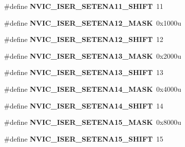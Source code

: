 \begin{DoxyCompactItemize}
\#define {\bfseries N\+V\+I\+C\+\_\+\+I\+S\+E\+R\+\_\+\+S\+E\+T\+E\+N\+A11\+\_\+\+S\+H\+I\+FT}~11
\item 
\mbox{\label{group___n_v_i_c___register___masks_ga16fd27360ca88d89cc020473705f9ec1}} 
\#define {\bfseries N\+V\+I\+C\+\_\+\+I\+S\+E\+R\+\_\+\+S\+E\+T\+E\+N\+A12\+\_\+\+M\+A\+SK}~0x1000u
\item 
\mbox{\label{group___n_v_i_c___register___masks_ga213045aecec6b1ed43907a4b82299437}} 
\#define {\bfseries N\+V\+I\+C\+\_\+\+I\+S\+E\+R\+\_\+\+S\+E\+T\+E\+N\+A12\+\_\+\+S\+H\+I\+FT}~12
\item 
\mbox{\label{group___n_v_i_c___register___masks_gaeb161f8e6f83117af452b4113a37c8f4}} 
\#define {\bfseries N\+V\+I\+C\+\_\+\+I\+S\+E\+R\+\_\+\+S\+E\+T\+E\+N\+A13\+\_\+\+M\+A\+SK}~0x2000u
\item 
\mbox{\label{group___n_v_i_c___register___masks_gabef7fa9ab8ffc006387cc848684579cd}} 
\#define {\bfseries N\+V\+I\+C\+\_\+\+I\+S\+E\+R\+\_\+\+S\+E\+T\+E\+N\+A13\+\_\+\+S\+H\+I\+FT}~13
\item 
\mbox{\label{group___n_v_i_c___register___masks_ga1339be31af808e4da80caa21f8842c84}} 
\#define {\bfseries N\+V\+I\+C\+\_\+\+I\+S\+E\+R\+\_\+\+S\+E\+T\+E\+N\+A14\+\_\+\+M\+A\+SK}~0x4000u
\item 
\mbox{\label{group___n_v_i_c___register___masks_ga69fbbf57e6d9797c235ee1c79486ef68}} 
\#define {\bfseries N\+V\+I\+C\+\_\+\+I\+S\+E\+R\+\_\+\+S\+E\+T\+E\+N\+A14\+\_\+\+S\+H\+I\+FT}~14
\item 
\mbox{\label{group___n_v_i_c___register___masks_ga1737ddd810d67e25757814b2856458b5}} 
\#define {\bfseries N\+V\+I\+C\+\_\+\+I\+S\+E\+R\+\_\+\+S\+E\+T\+E\+N\+A15\+\_\+\+M\+A\+SK}~0x8000u
\item 
\mbox{\label{group___n_v_i_c___register___masks_gab583ce8e80daddfd5d24d92644536598}} 
\#define {\bfseries N\+V\+I\+C\+\_\+\+I\+S\+E\+R\+\_\+\+S\+E\+T\+E\+N\+A15\+\_\+\+S\+H\+I\+FT}~15

\end{DoxyCompactItemize}

